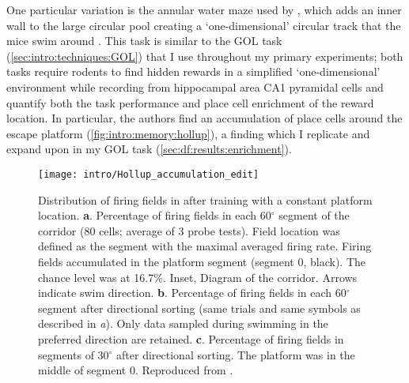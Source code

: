 One particular variation is the annular water maze used by \citeauthor{Hollup2001a}, which adds an inner wall to the large circular pool creating a `one-dimensional' circular track that the mice swim around \citep{Hollup2001a}.
This task is similar to the \ac{GOL} task (\autoref{sec:intro:techniques:GOL}) that I use throughout my primary experiments; both tasks require rodents to find hidden rewards in a simplified `one-dimensional' environment while recording from hippocampal area CA1 pyramidal cells and quantify both the task performance and place cell enrichment of the reward location.
In particular, the authors find an accumulation of place cells around the escape platform (\autoref{fig:intro:memory:hollup}), a finding which I replicate and expand upon in my \ac{GOL} task (\autoref{sec:df:results:enrichment}). 
\begin{figure}
	\centering
	\texttt{[image: intro/Hollup\_accumulation\_edit]}
	\caption[Distribution of firing fields in Hollup et al.]{Distribution of firing fields in \citeauthor{Hollup2001a} after training with a constant platform location.
	\textbf{a}. Percentage of firing fields in each 60$^{\circ}$ segment of the corridor (80 cells; average of 3 probe tests). Field location was defined as the segment with the maximal averaged firing rate. Firing fields accumulated in the platform segment (segment 0, black). The chance level was at 16.7\%. Inset, Diagram of the corridor. Arrows indicate swim direction.
	\textbf{b}. Percentage of firing fields in each 60$^{\circ}$ segment after directional sorting (same trials and same symbols as described in \textit{a}). Only data sampled during swimming in the preferred direction are retained.
	\textbf{c}. Percentage of firing fields in segments of 30$^{\circ}$ after directional sorting. The platform was in the middle of segment 0.
	Reproduced from \citet{Hollup2001a}.}
	\label{fig:intro:memory:hollup}
\end{figure}

